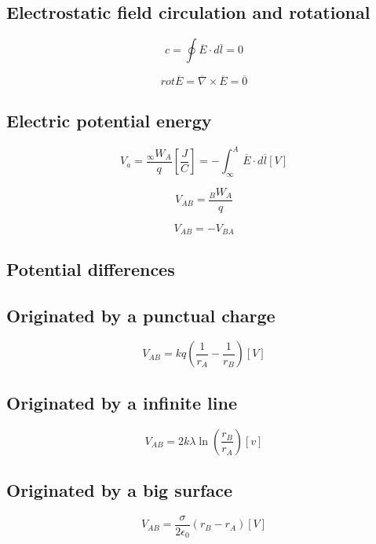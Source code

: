 \documentclass[letterpaper]{article}
\newcommand{\divline}{\noindent\makebox[\linewidth]{\rule{\textwidth}{0.4pt}}}
\begin{document}
    \divline
    \begin{multicols}{2}
        \section{Electrostatic field circulation and rotational}
        \[c = \oint \overline{E} \cdot d \overline{l} = 0\]

        \[rot \overline{E} = \overline{\nabla} \times \overline{E} = \overline{0}\]
    \end{multicols}

    \divline
    \begin{multicols}{2}
        \section{Electric potential energy}

        \[V_{a} = \frac{_{\infty} W_{A}}{q} \left[ \frac{J}{C} \right] = - \int_{\infty}^{A} \overline{E} \cdot d \overline{l} \left[ V \right] \]

        \[V_{AB} = \frac{_{B} W_{A}}{q}\]

        \[V_{AB} = - V_{BA}\]

        
    \end{multicols}

    \divline
    \begin{multicols}{2}
        \section{Potential differences}

        \subsection{Originated by a punctual charge}

        \[V_{AB} = kq \left( \frac{1}{r_{A}} - \frac{1}{r_{B}} \right) [V]\]

        \subsection{Originated by a infinite line}

        \[V_{AB} = 2k\lambda \ln \left( \frac{r_{B}}{r_{A}} \right) [v]\]

        \subsection{Originated by a big surface}

        \[V_{AB} = \frac{\sigma}{2 \epsilon_{0}} (r_{B} - r_{A}) [V]\]
    \end{multicols}
\end{document}

